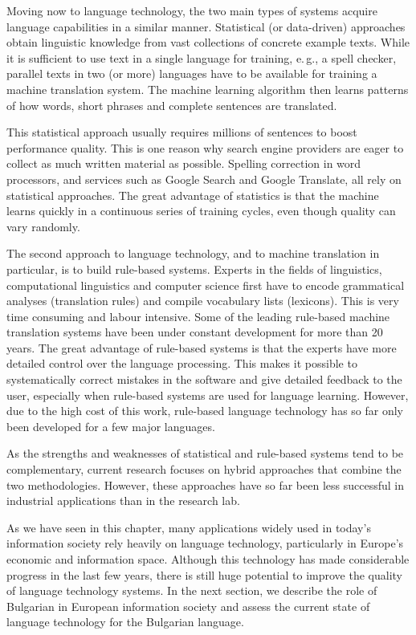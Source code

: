 \begin{multicols}{2}
  Moving now to language technology, the two main types of systems acquire language capabilities in a similar manner. Statistical (or data-driven) approaches obtain linguistic knowledge from vast collections of concrete example texts. While it is sufficient to use text in a single language for training, e.\,g., a spell checker, parallel texts in two (or more) languages have to be available for training a machine translation system. The machine learning algorithm then learns patterns of how words, short phrases and complete sentences are translated. 

  This statistical approach usually requires millions of sentences to boost performance quality. This is one reason why search engine providers are eager to collect as much written material as possible. Spelling correction in word processors, and services such as Google Search and Google Translate, all rely on statistical approaches. The great advantage of statistics is that the machine learns quickly in a continuous series of training cycles, even though quality can vary randomly.

  The second approach to language technology, and to machine translation in particular, is to build rule-based systems. Experts in the fields of linguistics, computational linguistics and computer science first have to encode grammatical analyses (translation rules) and compile vocabulary lists (lexicons). This is very time consuming and labour intensive. Some of the leading rule-based machine translation systems have been under constant development for more than 20 years. The great advantage of rule-based systems is that the experts have more detailed control over the language processing. This makes it possible to systematically correct mistakes in the software and give detailed feedback to the user, especially when rule-based systems are used for language learning. However, due to the high cost of this work, rule-based language technology has so far only been developed for a few major languages. 


  As the strengths and weaknesses of statistical and rule-based systems tend to be complementary, current research focuses on hybrid approaches that combine the two methodologies. However, these approaches have so far been less successful in industrial applications than in the research lab. 

  As we have seen in this chapter, many applications widely used in today’s information society rely heavily on language technology, particularly in Europe’s economic and information space. Although this technology has made considerable progress in the last few years, there is still huge potential to improve the quality of language technology systems. In the next section, we describe the role of Bulgarian in European information society and assess the current state of language technology for the Bulgarian language.
  \end{multicols}

